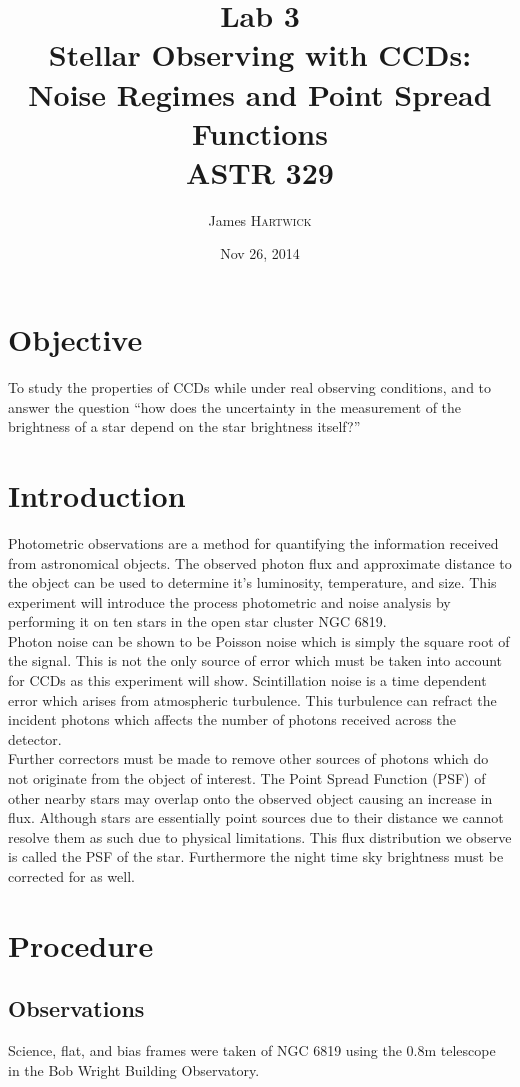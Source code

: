 \documentclass{article}
\title{Lab 3 \\ Stellar Observing with CCDs:
Noise Regimes and Point Spread Functions \\ ASTR 329} %
\author{James \textsc{Hartwick}} %
\date{Nov 26, 2014} %
\begin{document}
\maketitle %



\section{Objective}
To study the properties of CCDs while under real observing conditions, and to answer the question ``how does the uncertainty in the measurement of the brightness of a star depend on the star brightness itself?''
\section{Introduction}
Photometric observations are a method for quantifying the information received from astronomical objects. The observed photon flux and approximate distance to the object can be used to determine it's luminosity, temperature, and size. This experiment will introduce the process photometric and noise analysis by performing it on ten stars in the open star cluster NGC 6819.\\

Photon noise can be shown to be Poisson noise which is simply the square root of the signal. This is not the only source of error which must be taken into account for CCDs as this experiment will show. Scintillation noise is a time dependent error which arises from atmospheric turbulence. This turbulence can refract the incident photons which affects the number of photons received across the detector.\\

Further correctors must be made to remove other sources of photons which do not originate from the object of interest. The Point Spread Function (PSF) of other nearby stars may overlap onto the observed object causing an increase in flux. Although stars are essentially point sources due to their distance we cannot resolve them as such due to physical limitations. This flux distribution we observe is called the PSF of the star. Furthermore the night time sky brightness must be corrected for as well.

\section{Procedure}
\subsection{Observations}
Science, flat, and bias frames were taken of NGC 6819 using the 0.8m telescope in the Bob Wright Building Observatory.
\end{document}

